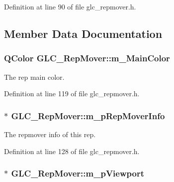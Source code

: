 Definition at line 90 of file glc\-\_\-repmover.\-h.



\subsection{Member Data Documentation}
\hypertarget{class_g_l_c___rep_mover_a89e1aa1f2afbf5c4c789ac1919ea4835}{
\subsubsection[{m\-\_\-\-Main\-Color}]{\setlength{\rightskip}{0pt plus 5cm}Q\-Color G\-L\-C\-\_\-\-Rep\-Mover\-::m\-\_\-\-Main\-Color\hspace{0.3cm}{\ttfamily [protected]}}}\label{class_g_l_c___rep_mover_a89e1aa1f2afbf5c4c789ac1919ea4835}


The rep main color. 



Definition at line 119 of file glc\-\_\-repmover.\-h.

\hypertarget{class_g_l_c___rep_mover_a82728f2103f60fa5cbfd59e2cceaaeac}{
\subsubsection[{m\-\_\-p\-Rep\-Mover\-Info}]{$\ast$ G\-L\-C\-\_\-\-Rep\-Mover\-::m\-\_\-p\-Rep\-Mover\-Info\hspace{0.3cm}{\ttfamily [protected]}}}\label{class_g_l_c___rep_mover_a82728f2103f60fa5cbfd59e2cceaaeac}


The repmover info of this rep. 



Definition at line 128 of file glc\-\_\-repmover.\-h.

\hypertarget{class_g_l_c___rep_mover_aa8dbd5ce987ca66a4af83b412e91fc03}{
\subsubsection[{m\-\_\-p\-Viewport}]{$\ast$ G\-L\-C\-\_\-\-Rep\-Mover\-::m\-\_\-p\-Viewport\hspace{0.3cm}{\ttfamily [protected]}}}\label{class_g_l_c___rep_mover_aa8dbd5ce987ca66a4af83b412e91fc03}


